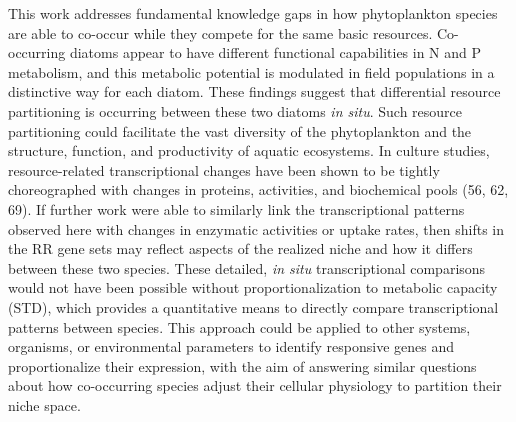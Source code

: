 This work addresses fundamental knowledge gaps in how phytoplankton species are able to co-occur while they compete for the same basic resources. Co-occurring diatoms appear to have different functional capabilities in N and P metabolism, and this metabolic potential is modulated in field populations in a distinctive way for each diatom. These findings suggest that differential resource partitioning is occurring between these two diatoms \textit{in situ}. Such resource partitioning could facilitate the vast diversity of the phytoplankton and the structure, function, and productivity of aquatic ecosystems. In culture studies, resource-related transcriptional changes have been shown to be tightly choreographed with changes in proteins, activities, and biochemical pools (56, 62, 69). If further work were able to similarly link the transcriptional patterns observed here with changes in enzymatic activities or uptake rates, then shifts in the RR gene sets may reflect aspects of the realized niche and how it differs between these two species. These detailed, \textit{in situ} transcriptional comparisons would not have been possible without proportionalization to metabolic capacity (STD), which provides a quantitative means to directly compare transcriptional patterns between species. This approach could be applied to other systems, organisms, or environmental parameters to identify responsive genes and proportionalize their expression, with the aim of answering similar questions about how co-occurring species adjust their cellular physiology to partition their niche space.\par

